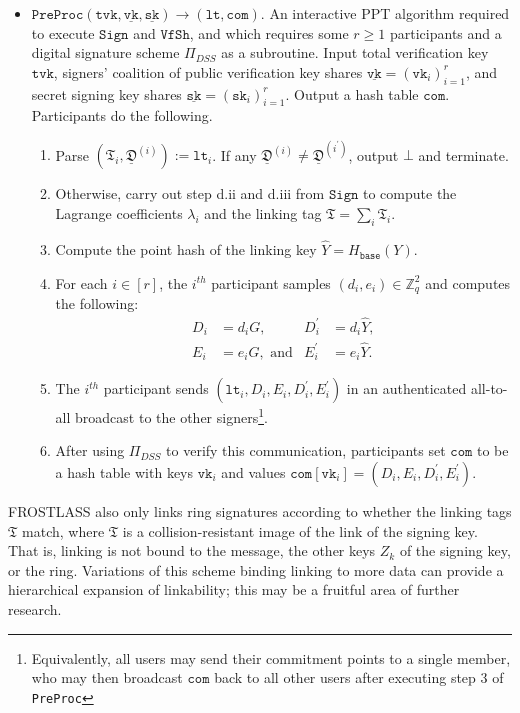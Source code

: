 \documentclass[11pt]{article}
\theoremstyle{definition}
\newcommand{\sk}{\texttt{sk}}
\newcommand{\vk}{\texttt{vk}}
\newcommand{\lt}{\texttt{lt}}
\newcommand{\tvk}{\texttt{tvk}}
\newcommand{\SK}{\underline{\texttt{sk}}}
\newcommand{\VK}{\underline{\texttt{vk}}}
\newcommand{\Zq}{\mathbb{Z}_q}
\newcommand{\preproc}{\texttt{PreProc}}
\newcommand{\sign}{\texttt{Sign}}
\newcommand{\verifyshare}{\texttt{VfSh}}
\begin{document}
\begin{itemize}
\item $\preproc(\tvk, \VK, \SK) \to (\lt,  \texttt{com})$. An interactive PPT algorithm required to execute $\sign$ and $\verifyshare$, and which requires some $r \geq 1$ participants and a digital signature scheme $\Pi_{DSS}$ as a subroutine. Input total verification key $\tvk$, signers' coalition of public verification key shares $\VK = (\vk_i)_{i=1}^{r}$, and secret signing key shares $\SK = (\sk_i)_{i=1}^{r}$. Output a hash table $\texttt{com}$. 
 Participants do the following. 
\begin{enumerate}
\item Parse $(\mathfrak{T}_i, \underline{\mathfrak{D}}^{(i)}) := \lt_i$. If any $\underline{\mathfrak{D}}^{(i)} \neq \underline{\mathfrak{D}}^{(i^\prime)}$, output $\bot$ and terminate. 
\item Otherwise, carry out step d.ii and d.iii from $\sign$ to compute the Lagrange coefficients $\lambda_i$ and the linking tag $\mathfrak{T} = \sum_i \mathfrak{T}_i$.
\item Compute the point hash of the linking key $\widehat{Y} = H_{\texttt{base}}(Y)$.
\item For each $i \in [r]$, the $i^{th}$ participant samples $(d_i, e_i) \in \Zq^2$ and computes the following:
\begin{align*}
D_i &= d_i G, & D_i^\prime &= d_i \widehat{Y}, \\
E_i &= e_i G,\text{ and} &
E_i^\prime &= e_i \widehat{Y}.
\end{align*}
\item The $i^{th}$ participant sends $(\lt_i, D_i, E_i, D^\prime_i, E^\prime_i)$ in an authenticated all-to-all broadcast to the other signers\footnote{Equivalently, all users may send their commitment points to a single member, who may then broadcast $\texttt{com}$ back to all other users after executing step 3 of \texttt{PreProc}}.

\item After using $\Pi_{DSS}$ to verify this communication, participants set $\texttt{com}$ to be a hash table with keys $\vk_i$ and values $\texttt{com}[\vk_i] = (D_i, E_i, D^\prime_i, E^\prime_i)$.
\end{enumerate}
\end{itemize}


FROSTLASS also only links ring signatures according to whether the linking tags $\mathfrak{T}$ match, where $\mathfrak{T}$ is a collision-resistant image of the link of the signing key. That is, linking is not bound to the message, the other keys $Z_k$ of the signing key, or the ring. Variations of this scheme binding linking to more data can provide a hierarchical expansion of linkability; this may be a fruitful area of further research.
\end{document}
